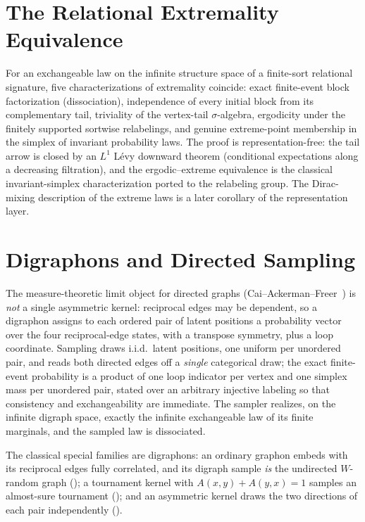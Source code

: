 
\section{The Relational Extremality Equivalence}

For an exchangeable law on the infinite structure space of a finite-sort relational
signature, five characterizations of extremality coincide: exact finite-event block
factorization (dissociation), independence of every initial block from its complementary
tail, triviality of the vertex-tail $\sigma$-algebra, ergodicity under the finitely
supported sortwise relabelings, and genuine extreme-point membership in the simplex of
invariant probability laws. The proof is representation-free: the tail arrow is closed by an
$L^1$ L\'evy downward theorem (conditional expectations along a decreasing filtration), and
the ergodic--extreme equivalence is the classical invariant-simplex characterization ported
to the relabeling group. The Dirac-mixing description of the extreme laws is a later
corollary of the representation layer.


\section{Digraphons and Directed Sampling}

The measure-theoretic limit object for directed graphs
(Cai--Ackerman--Freer~\cite[\S 2.3--2.4]{caf2016}) is \emph{not} a single asymmetric kernel:
reciprocal edges may be dependent, so a digraphon assigns to each ordered pair of latent
positions a probability vector over the four reciprocal-edge states, with a transpose symmetry,
plus a loop coordinate. Sampling draws i.i.d.\ latent positions, one uniform per unordered
pair, and reads both directed edges off a \emph{single} categorical draw; the exact finite-event
probability is a product of one loop indicator per vertex and one simplex mass per unordered
pair, stated over an arbitrary injective labeling so that consistency and exchangeability are
immediate. The sampler realizes, on the infinite digraph space, exactly the infinite
exchangeable law of its finite marginals, and the sampled law is dissociated.


The classical special families are digraphons: an ordinary graphon embeds with its reciprocal
edges fully correlated, and its digraph sample \emph{is} the undirected $W$-random graph
(\cite[\S 3.2.1]{caf2016}); a tournament kernel with $A(x,y)+A(y,x)=1$ samples an almost-sure
tournament (\cite[\S 3.2.2]{caf2016}); and an asymmetric kernel draws the two directions of
each pair independently (\cite[\S 3.1]{caf2016}).

